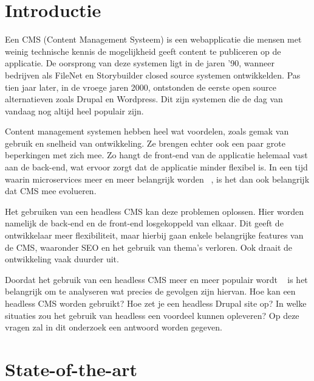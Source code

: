 
\section{Introductie} %
\label{sec:introductie}

Een CMS (Content Management Systeem) is een 
webapplicatie die mensen met weinig technische kennis de mogelijkheid geeft content te publiceren op de applicatie. De oorsprong van deze systemen ligt in de jaren '90, wanneer bedrijven als FileNet en Storybuilder closed source systemen ontwikkelden. Pas tien jaar later, in de vroege jaren 2000, ontstonden de eerste open source alternatieven zoals Drupal en Wordpress. Dit zijn systemen die de dag van vandaag nog altijd heel populair zijn. ~\autocite{Burgy2020}

Content management systemen hebben heel wat voordelen, zoals gemak van gebruik en snelheid van ontwikkeling. Ze brengen echter ook een paar grote beperkingen met zich mee. Zo hangt de front-end van de applicatie helemaal vast aan de back-end, wat ervoor zorgt dat de applicatie minder flexibel is. In een tijd waarin microservices meer en meer belangrijk worden ~\autocite{Shabani2021}, is het dan ook belangrijk dat CMS mee evolueren.

Het gebruiken van een headless CMS kan deze problemen oplossen. Hier worden namelijk de back-end en de front-end losgekoppeld van elkaar. Dit geeft de ontwikkelaar meer flexibiliteit, maar hierbij gaan enkele belangrijke features van de CMS, waaronder SEO en het gebruik van thema's verloren. Ook draait de ontwikkeling vaak duurder uit. ~\autocite{Luksza}

Doordat het gebruik van een headless CMS meer en meer populair wordt ~\autocite{Luksza} is het belangrijk om te analyseren wat precies de gevolgen zijn hiervan. Hoe kan een headless CMS worden gebruikt? Hoe zet je een headless Drupal site op? In welke situaties zou het gebruik van headless een voordeel kunnen opleveren? Op deze vragen zal in dit onderzoek een antwoord worden gegeven.





\section{State-of-the-art}
\label{sec:state-of-the-art}

